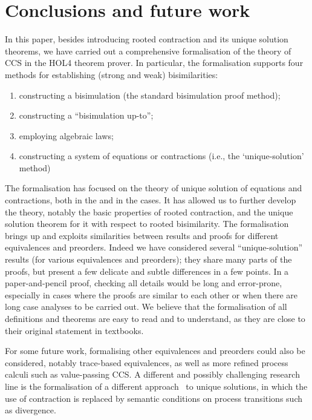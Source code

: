 
\section{Conclusions and future work}
\label{s:concl}

In this paper, besides introducing rooted contraction and its
unique solution theorems,
we have carried out a comprehensive formalisation of the theory of CCS in the
HOL4 theorem prover. In particular, the formalisation supports four
methods for establishing (strong and weak) bisimilarities:
\begin{enumerate}
\item constructing a bisimulation (the standard bisimulation proof
method);
\item constructing a ``bisimulation up-to''; 
\item employing algebraic laws;
\item constructing a system of equations or contractions
(i.e., the `unique-solution' method)
\end{enumerate}

The formalisation has focused on the theory of unique solution of
equations and contractions, both in the \univariate and in the
\multivariate cases. It has allowed us to further develop the theory,
notably the basic properties of rooted contraction, and the unique
solution theorem for it with respect to rooted bisimilarity.  The
formalisation brings up and exploits similarities between results and
proofs for different equivalences and preorders. Indeed we have
considered several ``unique-solution'' results (for various
equivalences and preorders); they share many parts of the proofs, but
present a few delicate and subtle differences in a few points. In a
paper-and-pencil proof, checking all details would be long and
error-prone, especially in cases where the proofs are similar to each
other or when there are long case analyses to be carried out.  We
believe that the formalisation of all definitions and theorems are
easy to read and to understand, as they are close to their original
statement in textbooks.

For some future work, formalising other equivalences and preorders
could also be considered, notably trace-based equivalences, as well as
more refined process calculi such as value-passing CCS.
%
A different and possibly challenging research line is
 the formalisation of a different
approach~\cite{DurierHS17,DurierHS18} to unique
solutions, in which the use of contraction is
replaced by semantic conditions on process transitions such as
divergence.
%

